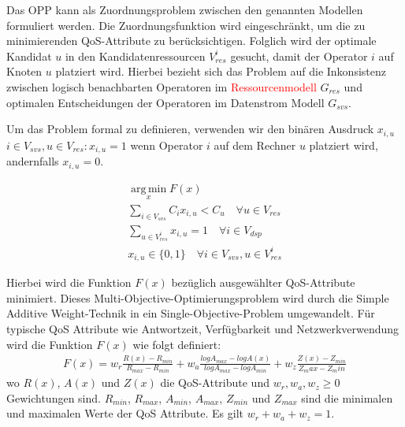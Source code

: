 \documentclass{article}
\begin{document}
Das OPP kann als Zuordnungsproblem zwischen den genannten Modellen formuliert werden. 
Die Zuordnungsfunktion wird eingeschränkt, um die zu minimierenden QoS-Attribute zu berücksichtigen. 
Folglich wird der optimale Kandidat $u$ in den Kandidatenressourcen $V_{res}^i$
gesucht, damit der Operator $i$ auf Knoten $u$ platziert wird.
Hierbei bezieht sich das Problem auf die Inkonsistenz zwischen 
logisch benachbarten Operatoren im \textcolor{red}{Ressourcenmodell} $G_{res}$ und optimalen Entscheidungen der Operatoren im Datenstrom Modell $G_{svs}$.

Um das Problem formal zu definieren, verwenden wir den binären Ausdruck $x_{i,u}$ $i \in V_{svs}, u \in V_{res}: x_{i,u} = 1$ wenn Operator $i$
auf dem Rechner $u$ platziert wird, andernfalls $x_{i,u} = 0$.

\[ 
    \begin{gathered}
        \operatorname*{arg\,min}_x F(x) \\
        \sum_{i \in V_{svs}} C_i x_{i,u} < C_u \quad \forall u \in V_{res} \\ %
        \sum_{u \in V_{res}^i} x_{i,u} = 1 \quad \forall i \in V_{dsp} \\ %
        x_{i,u} \in \{0,1\} \quad \forall i \in V_{svs}, u \in V_{res}^i
    \end{gathered}
\] 

Hierbei wird die Funktion $F(x)$ bezüglich ausgewählter QoS-Attribute minimiert. 
Dieses Multi-Objective-Optimierungsproblem wird durch die Simple Additive Weight-Technik \cite{yoon-multiple-optimization} in ein Single-Objective-Problem umgewandelt.
Für typische QoS Attribute wie Antwortzeit, Verfügbarkeit und Netzwerkverwendung \cite{efficient-operator-placement} wird die Funktion $F(x)$ wie folgt definiert:
\[ 
    \begin{gathered}
        F(x) = w_r \frac{R(x) - R_{min}}{R_{max} - R_{min}} 
        + w_a \frac{log A_{max} - log A(x)}{log A_{max} - log A_{min}} 
        + w_z \frac{Z(x) - Z_{min}}{Z_max - Z_min} 
    \end{gathered}  \label{to-miminize-function}
\] 
wo $R(x)$, $A(x)$ und $Z(x)$ die QoS-Attribute und $w_r, w_a, w_z \geq 0$ Gewichtungen sind. $R_{min}$, $R_{max}$, $A_{min}$, $A_{max}$, $Z_{min}$ und $Z_{max}$ sind die minimalen und maximalen Werte der QoS Attribute.
Es gilt $w_r + w_a + w_z = 1$.


\end{document}
